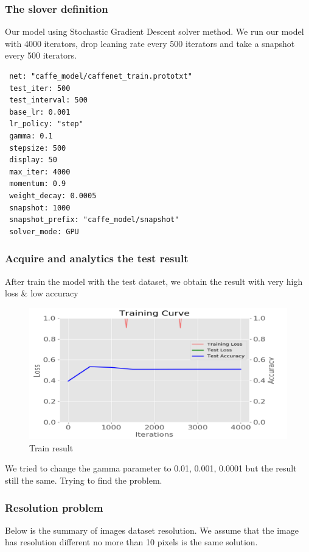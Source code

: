 \documentclass[11pt]{article}
\begin{document}
\subsubsection{The slover definition}
Our model using Stochastic Gradient Descent solver method. We run our model with 4000 iterators, drop leaning rate every 500 iterators and take a snapshot every 500 iterators.
\begin{verbatim}
 net: "caffe_model/caffenet_train.prototxt"
 test_iter: 500
 test_interval: 500
 base_lr: 0.001
 lr_policy: "step"
 gamma: 0.1
 stepsize: 500
 display: 50
 max_iter: 4000
 momentum: 0.9
 weight_decay: 0.0005
 snapshot: 1000
 snapshot_prefix: "caffe_model/snapshot"
 solver_mode: GPU
\end{verbatim}

\subsubsection{Acquire and analytics the test result}

After train the model with the test dataset, we obtain the result with very high loss \& low accuracy

\begin{figure}[H]
\centering
\includegraphics[width=1\textwidth]{images/train_first_time}
\caption{Train result}
\end{figure}
We tried to change the gamma parameter to 0.01, 0.001, 0.0001 but the result still the same. Trying to find the problem.

\subsubsection{Resolution problem}
Below is the summary of images dataset resolution. We assume that the image has resolution different no more than 10 pixels is the same solution.
\end{document}
